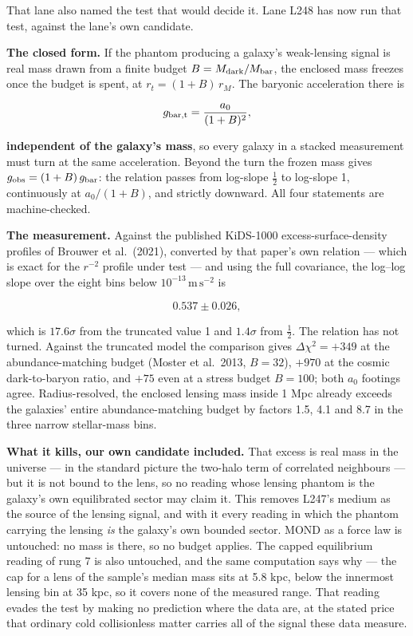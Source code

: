 \documentclass[
  11pt,
]{article}
\newcounter{none} %
\begin{document}
That lane also named the test that would decide it. Lane L248 has now
run that test, against the lane's own candidate.

\textbf{The closed form.} If the phantom producing a galaxy's
weak-lensing signal is real mass drawn from a finite budget
\(B = M_{\rm dark}/M_{\rm bar}\), the enclosed mass freezes once the
budget is spent, at \(r_t = (1+B)\,r_M\). The baryonic acceleration
there is

\[g_{\rm bar,t} = \frac{a_0}{(1+B)^2},\]

\textbf{independent of the galaxy's mass}, so every galaxy in a stacked
measurement must turn at the same acceleration. Beyond the turn the
frozen mass gives \(g_{\rm obs} = (1+B)\,g_{\rm bar}\): the relation
passes from log-slope \(\tfrac12\) to log-slope 1, continuously at
\(a_0/(1+B)\), and strictly downward. All four statements are
machine-checked.

\textbf{The measurement.} Against the published KiDS-1000
excess-surface-density profiles of Brouwer et al.~(2021), converted by
that paper's own relation --- which is exact for the \(r^{-2}\) profile
under test --- and using the full covariance, the log--log slope over
the eight bins below \(10^{-13}\,\mathrm{m\,s^{-2}}\) is

\[0.537 \pm 0.026,\]

which is \(17.6\sigma\) from the truncated value 1 and \(1.4\sigma\)
from \(\tfrac12\). The relation has not turned. Against the truncated
model the comparison gives \(\Delta\chi^2 = +349\) at the
abundance-matching budget (Moster et al.~2013, \(B = 32\)), \(+970\) at
the cosmic dark-to-baryon ratio, and \(+75\) even at a stress budget
\(B = 100\); both \(a_0\) footings agree. Radius-resolved, the enclosed
lensing mass inside 1 Mpc already exceeds the galaxies' entire
abundance-matching budget by factors 1.5, 4.1 and 8.7 in the three
narrow stellar-mass bins.

\textbf{What it kills, our own candidate included.} That excess is real
mass in the universe --- in the standard picture the two-halo term of
correlated neighbours --- but it is not bound to the lens, so no reading
whose lensing phantom is the galaxy's own equilibrated sector may claim
it. This removes L247's medium as the source of the lensing signal, and
with it every reading in which the phantom carrying the lensing
\emph{is} the galaxy's own bounded sector. MOND as a force law is
untouched: no mass is there, so no budget applies. The capped
equilibrium reading of rung 7 is also untouched, and the same
computation says why --- the cap for a lens of the sample's median mass
sits at 5.8 kpc, below the innermost lensing bin at 35 kpc, so it covers
none of the measured range. That reading evades the test by making no
prediction where the data are, at the stated price that ordinary cold
collisionless matter carries all of the signal these data measure.
\end{document}
